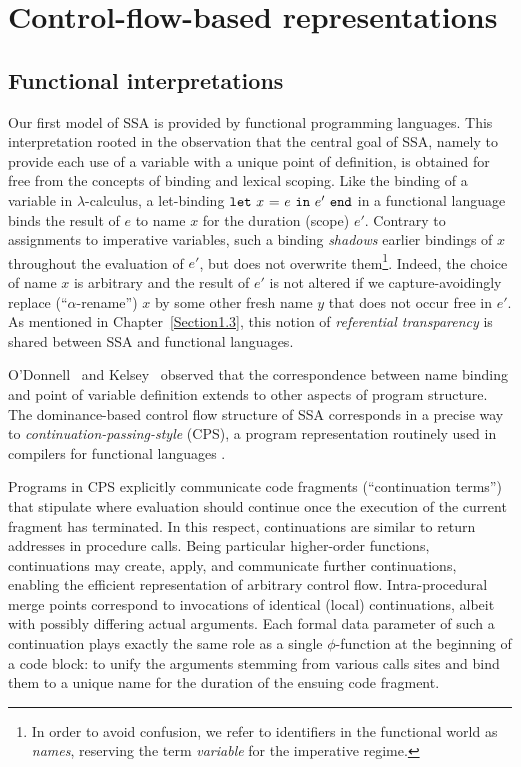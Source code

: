 \section{Control-flow-based representations}

\subsection{Functional interpretations}
\label{section:Part1:Semantics:FunctionalLanguages}

Our first model of SSA is provided by functional programming
languages. This interpretation rooted in the observation that the
central goal of SSA, namely to provide each use of a variable with a
unique point of definition, is obtained for free from the concepts of
binding and lexical scoping. Like the binding of a variable in
$\lambda$-calculus, a let-binding $\mathtt{let}\ {x}\ \mathtt{=}\ {e}\ \mathtt{in}\ {e'}\ \mathtt{end}$ in a functional
language binds the result of $e$ to name $x$ for the duration (scope)
$e'$.  Contrary to assignments to imperative variables, such a binding
\emph{shadows} earlier bindings of $x$ throughout the evaluation
of $e'$, but does not overwrite them\footnote{In order to avoid
confusion, we refer to identifiers in the functional world as
\emph{names}, reserving the term \emph{variable} for the imperative
regime.}. Indeed, the choice of name $x$ is arbitrary and the
result of $e'$ is not altered if we capture-avoidingly replace
(``$\alpha$-rename'') $x$ by some other fresh name $y$ that does not
occur free in $e'$. As mentioned in Chapter~\ref{Section1.3}, this
notion of \emph{referential transparency} is shared between SSA and
functional languages.

O'Donnell~\cite{ODonnellPhD} and Kelsey~\cite{Kelsey95} observed that
the correspondence between name binding and point of variable
definition extends to other aspects of program structure. The
dominance-based control flow structure of SSA corresponds in a precise
way to \emph{continuation-passing-style} (CPS), a program
representation routinely used in compilers for functional languages
\cite{DBLP:journals/lisp/SussmanS98a,Appel:CWC}.

Programs in CPS explicitly communicate code fragments (``continuation
terms'') that stipulate where evaluation should continue once the
execution of the current fragment has terminated. In this respect,
continuations are similar to return addresses in procedure
calls. Being particular higher-order functions, continuations may
create, apply, and communicate further continuations, enabling the
efficient representation of arbitrary control flow.  Intra-procedural
merge points correspond to invocations of identical (local)
continuations, albeit with possibly differing actual arguments.  Each
formal data parameter of such a continuation plays exactly the same
role as a single $\phi$-function at the beginning of a code block: to
unify the arguments stemming from various calls sites and bind them to
a unique name for the duration of the ensuing code fragment.

